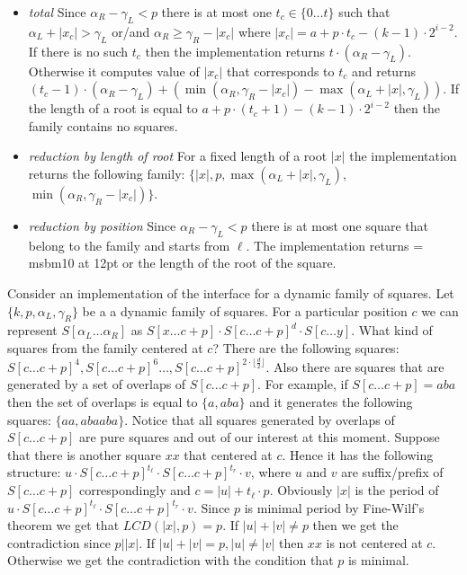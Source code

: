 \documentclass[11pt]{article}
\theoremstyle{break}
\newcommand{\substr}[2]{[#1\dots#2]}
\renewcommand{\emptyset}{
    \font\msbm = msbm10 at 12pt
    \mbox{\msbm \char 63}
}
\begin{document}
\begin{itemize}
  \item \emph{total} Since $\alpha_R - \gamma_L < p$ there is at most one $t_{c} \in \{0 \dots t\}$ such that $\alpha_L
  + |x_c| > \gamma_L$ or/and $\alpha_R \geq \gamma_R-|x_c|$ where $|x_c| = a + p\cdot t_c - (k-1)\cdot 2^{i-2}$. If
  there is no such $t_c$ then the implementation returns $t \cdot (\alpha_R - \gamma_L)$. Otherwise it computes value of
  $|x_c|$ that corresponds to $t_c$ and returns $(t_c - 1) \cdot (\alpha_R - \gamma_L) + (\min(\alpha_R, \gamma_R-|x_c|)
  - \max(\alpha_L + |x|, \gamma_L))$. If the length of a root is equal to $a + p\cdot (t_c + 1) - (k-1)\cdot
  2^{i-2}$ then the family contains no squares.
  \item \emph{reduction by length of root} For a fixed length of a root $|x|$ the implementation returns the following family:
  $\{|x|, p, \max(\alpha_L + |x|, \gamma_L)$, $\min(\alpha_R, \gamma_R-|x_c|)\}$.
  \item \emph{reduction by position} Since $\alpha_R - \gamma_L < p$ there is at most one square that belong to the
  family and starts from $\ell$. The implementation returns \emptyset or the length of the root of the square.
\end{itemize}

Consider an implementation of the interface for a dynamic family of squares. Let $\{k, p, \alpha_L, \gamma_R\}$ be a a dynamic
family of squares. For a particular position $c$ we can represent $S\substr{\alpha_L}{\alpha_R}$ as $S\substr{x}{c+p} \cdot
S\substr{c}{c+p}^d \cdot S\substr{c}{y}$. What kind of squares from the family centered at $c$? There are the following squares:
$S\substr{c}{c+p}^4, S\substr{c}{c+p}^6 \dots, S\substr{c}{c+p}^{2 \cdot \lfloor \frac{d}{2}\rfloor}$. Also there are squares that are
generated by a set of overlaps of $S\substr{c}{c+p}$. For example, if $S\substr{c}{c+p} = aba$ then the set of overlaps is equal to $\{a,
aba\}$ and it generates the following squares: $\{aa, abaaba\}$. Notice that all squares generated by overlaps of $S\substr{c}{c+p}$ are
pure squares and out of our interest at this moment. Suppose that there is another square $xx$ that centered at $c$. Hence it has the
following structure: $u \cdot S\substr{c}{c+p}^{t_\ell} \cdot S\substr{c}{c+p}^{t_r} \cdot v$, where $u$ and $v$ are suffix/prefix of
$S\substr{c}{c+p}$ correspondingly and $c = |u| + t_\ell \cdot p$. Obviously $|x|$ is the period of $u \cdot S\substr{c}{c+p}^{t_\ell}
\cdot S\substr{c}{c+p}^{t_r} \cdot v$. Since $p$ is minimal period by Fine-Wilf's theorem \cite{20}  we get that $LCD(|x|, p) = p$.  If
$|u| + |v| \neq p$ then we get the contradiction since $p | |x|$. If $|u| + |v| = p, |u| \neq |v|$ then $xx$ is not centered at $c$.
Otherwise we get the contradiction with the condition that $p$ is minimal.
\end{document}
